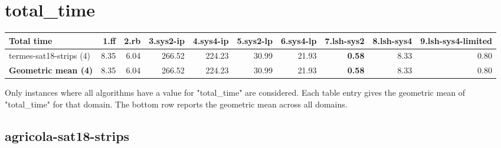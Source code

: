 \documentclass{article}
\newcommand{\numtasks}[1]{\small{(#1)}}
\begin{document}
\hypertarget{total_time}{}
\section*{total\_time}

\begin{tabular}{@{}lrrrrrrrrr@{}}
Total time & 1.ff & 2.rb & 3.sys2-ip & 4.sys4-ip & 5.sys2-lp & 6.sys4-lp & 7.lsh-sys2 & 8.lsh-sys4 & 9.lsh-sys4-limited \\
\midrule
termes-sat18-strips \numtasks{4} & 8.35 & 6.04 & 266.52 & 224.23 & 30.99 & 21.93 & \textbf{0.58} & 8.33 & 0.80 \\
\textbf{Geometric mean \numtasks{4}} & 8.35 & 6.04 & 266.52 & 224.23 & 30.99 & 21.93 & \textbf{0.58} & 8.33 & 0.80 \\
\end{tabular}

Only instances where all algorithms have a value for "total\_time" are considered. Each table entry gives the geometric mean of "total\_time" for that domain. The bottom row reports the geometric mean across all domains.

\hypertarget{total_time-agricola-sat18-strips}{}
\subsection*{agricola-sat18-strips}
\end{document}

